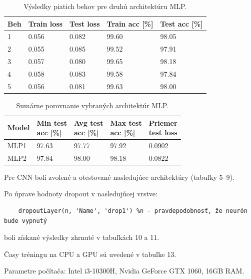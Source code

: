 \documentclass[12pt, a4paper]{article}
\begin{document}
\begin{table}[htbp]
\centering
\caption{Výsledky piatich behov pre druhú architektúru MLP.}
\label{tab:mlp2_runs}
\begin{tabular}{lllll}
\toprule
Beh & Train loss & Test loss & Train acc [\%] & Test acc [\%] \\
\midrule
1 & 0.056 & 0.082 & 99.60 & 98.05 \\
2 & 0.055 & 0.085 & 99.52 & 97.91 \\
3 & 0.057 & 0.080 & 99.65 & 98.18 \\
4 & 0.058 & 0.083 & 99.58 & 97.84 \\
5 & 0.056 & 0.081 & 99.63 & 98.00 \\
\bottomrule
\end{tabular}
\end{table}

\newpage
\begin{table}[htbp]
\centering
\caption{Sumárne porovnanie vybraných architektúr MLP.}
\label{tab:mlp_summary}
\begin{tabular}{lllll}
\toprule
Model & \shortstack{Min test\\acc [\%]} & \shortstack{Avg test\\acc [\%]} & \shortstack{Max test\\acc [\%]} & \shortstack{Priemer\\test loss} \\
\midrule
MLP1 & 97.63 & 97.77 & 97.92 & 0.0902 \\
MLP2 & 97.84 & 98.00 & 98.18 & 0.0822 \\
\bottomrule
\end{tabular}
\end{table}

Pre CNN boli zvolené a otestované nasledujúce architektúry (tabuľky 5–9).

Po úprave hodnoty dropout v nasledujúcej vrstve:

\begin{verbatim}
    dropoutLayer(n, 'Name', 'drop1') %n - pravdepodobnosť, že neurón bude vypnutý
\end{verbatim}
boli získané výsledky zhrnuté v tabuľkách 10 a 11.

Časy tréningu na CPU a GPU sú uvedené v tabuľke 13.

Parametre počítača: Intel i3-10300H, Nvidia GeForce GTX 1060, 16GB RAM.
\end{document}
